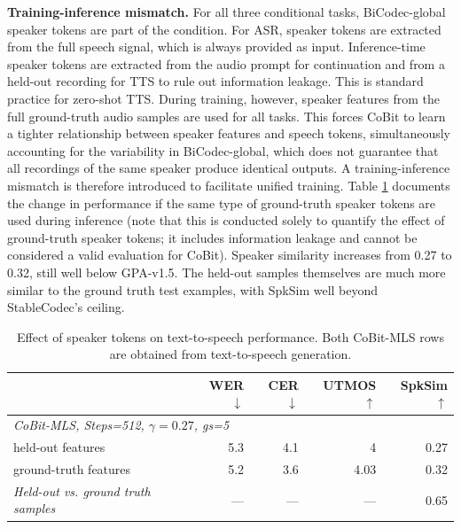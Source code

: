 \textbf{Training-inference mismatch.} For all three conditional tasks, BiCodec-global speaker tokens are part of the condition. For ASR, speaker tokens are extracted from the full speech signal, which is always provided as input. Inference-time speaker tokens are extracted from the audio prompt for continuation and from a held-out recording for TTS to rule out information leakage. This is standard practice for zero-shot TTS. During training, however, speaker features from the full ground-truth audio samples are used for all tasks. This forces CoBit to learn a tighter relationship between speaker features and speech tokens, simultaneously accounting for the variability in BiCodec-global, which does not guarantee that all recordings of the same speaker produce identical outputs. A training-inference mismatch is therefore introduced to facilitate unified training. Table \ref{tab:audio:spksim} documents the change in performance if the same type of ground-truth speaker tokens are used during inference (note that this is conducted solely to quantify the effect of ground-truth speaker tokens; it includes information leakage and cannot be considered a valid evaluation for CoBit). Speaker similarity increases from 0.27 to 0.32, still well below GPA-v1.5. The held-out samples themselves are much more similar to the ground truth test examples, with SpkSim well beyond StableCodec's ceiling.

\begin{table}[t]
\centering
\small
\setlength{\tabcolsep}{4.5pt}
\begin{tabular}{lrrrr}
\toprule
 & \textbf{WER}$\downarrow$ & \textbf{CER}$\downarrow$ & \textbf{UTMOS}$\uparrow$ & \textbf{SpkSim}$\uparrow$ \\
\midrule
\multicolumn{5}{l}{\emph{CoBit-MLS, Steps=512, $\gamma=0.27$, gs=5}} \\
held-out features & 5.3 & 4.1 & 4 & 0.27 \\
ground-truth features & 5.2 & 3.6 & 4.03 & 0.32 \\
\midrule
\emph{Held-out vs. ground truth samples} & --- & --- & --- & 0.65 \\
\bottomrule
\end{tabular}
\caption{Effect of speaker tokens on text-to-speech performance. Both CoBit-MLS rows are obtained from text-to-speech generation.}
\label{tab:audio:spksim}
\end{table}

